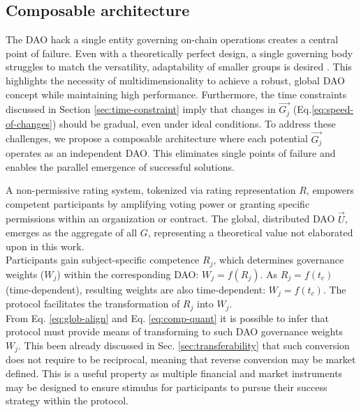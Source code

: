 \documentclass{article}
\begin{document}
\begin{CJK}{UTF8}{gbsn}
\begin{multicols}{2}
            \subsection{Composable architecture}
            The DAO hack\cite{Liu2021} a single entity governing on-chain operations creates a central point of failure. Even with a theoretically perfect design, a single governing body struggles to match the versatility, adaptability of smaller groups is desired \cite{Buterin22}.  This highlights the necessity of multidimensionality to achieve a robust, global DAO concept while maintaining high performance.
            Furthermore, the time constraints discussed in Section \ref{sec:time-constraint} imply that changes in ${\vec{G_j}}$ (Eq.\ref{eq:speed-of-changes}) should be gradual, even under ideal conditions.
            To address these challenges, we propose a composable architecture where each potential ${\vec{G_j}}$ operates as an independent DAO. This eliminates single points of failure and enables the parallel emergence of successful solutions.

            A non-permissive rating system, tokenized via rating representation $R$, empowers competent participants by amplifying voting power or granting specific permissions within an organization or contract. The global, distributed DAO $\vec{U}$, emerges as the aggregate of all $G$, representing a theoretical value not elaborated upon in this work. \\
            Participants gain subject-specific competence $R_{j}$, which determines governance weights ($W_j$) within the corresponding DAO: $W_j = f(R_{j})$. As $R_j=f(t_c)$ (time-dependent), resulting weights are also time-dependent: $W_j=f(t_c)$. The protocol facilitates the transformation of $R_j$ into $W_j$.
            \\From Eq. \ref{eq:glob-align} and Eq. \ref{eq:comp-quant} it is possible to infer that protocol must provide means of transforming  to such DAO governance weights $W_j$.  This been already discussed in Sec. \ref{sec:transferability} that such conversion does not require to be reciprocal, meaning that reverse conversion may be market defined. This is a useful property as multiple financial and market instruments may be designed to ensure stimulus for participants to pursue their success strategy within the protocol.  \\ 

\end{multicols}
\end{CJK}
\end{document}
